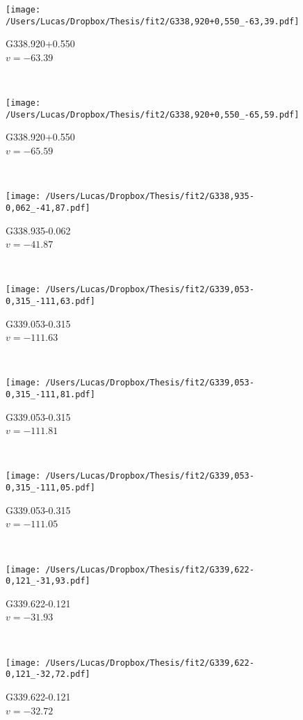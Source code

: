 \begin{figure*}[t]\ContinuedFloat
	\centering
	\begin{subfigure}[t]{0.3\textwidth}
		\texttt{[image: /Users/Lucas/Dropbox/Thesis/fit2/G338,920+0,550\_-63,39.pdf]}
		\caption[]{G338.920+0.550\\$v=-63.39$\,\kms}
	\end{subfigure}
	~
	\begin{subfigure}[t]{0.3\textwidth}
		\texttt{[image: /Users/Lucas/Dropbox/Thesis/fit2/G338,920+0,550\_-65,59.pdf]}
		\caption[]{G338.920+0.550\\$v=-65.59$\,\kms}
	\end{subfigure}
	~
	\begin{subfigure}[t]{0.3\textwidth}
		\texttt{[image: /Users/Lucas/Dropbox/Thesis/fit2/G338,935-0,062\_-41,87.pdf]}
		\caption[]{G338.935-0.062\\$v=-41.87$\,\kms}
	\end{subfigure}
	~
	\begin{subfigure}[t]{0.3\textwidth}
		\texttt{[image: /Users/Lucas/Dropbox/Thesis/fit2/G339,053-0,315\_-111,63.pdf]}
		\caption[]{G339.053-0.315\\$v=-111.63$\,\kms}
	\end{subfigure}
	~
	\begin{subfigure}[t]{0.3\textwidth}
		\texttt{[image: /Users/Lucas/Dropbox/Thesis/fit2/G339,053-0,315\_-111,81.pdf]}
		\caption[]{G339.053-0.315\\$v=-111.81$\,\kms}
	\end{subfigure}
	~
	\begin{subfigure}[t]{0.3\textwidth}
		\texttt{[image: /Users/Lucas/Dropbox/Thesis/fit2/G339,053-0,315\_-111,05.pdf]}
		\caption[]{G339.053-0.315\\$v=-111.05$\,\kms}
	\end{subfigure}
	~
	\begin{subfigure}[t]{0.3\textwidth}
		\texttt{[image: /Users/Lucas/Dropbox/Thesis/fit2/G339,622-0,121\_-31,93.pdf]}
		\caption[]{G339.622-0.121\\$v=-31.93$\,\kms}
	\end{subfigure}
	~
	\begin{subfigure}[t]{0.3\textwidth}
		\texttt{[image: /Users/Lucas/Dropbox/Thesis/fit2/G339,622-0,121\_-32,72.pdf]}
		\caption[]{G339.622-0.121\\$v=-32.72$\,\kms}

\end{subfigure}
\end{figure*}
